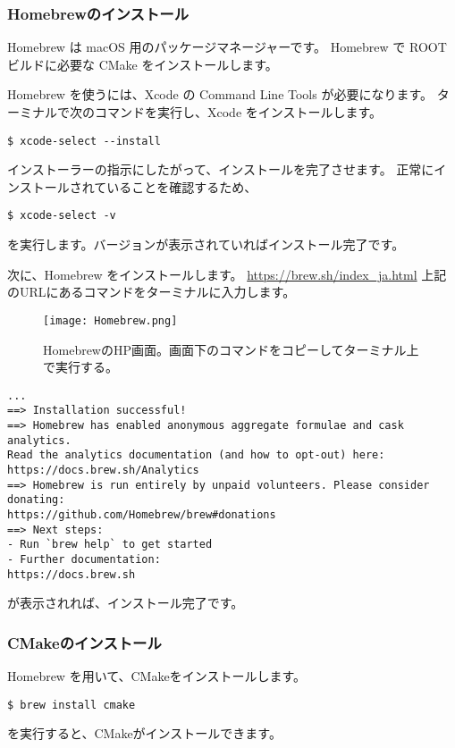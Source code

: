\subsubsection{Homebrewのインストール}
Homebrew は macOS 用のパッケージマネージャーです。
Homebrew で ROOT ビルドに必要な CMake をインストールします。\par
Homebrew を使うには、Xcode の Command Line Tools が必要になります。
ターミナルで次のコマンドを実行し、Xcode をインストールします。
\begin{lstlisting}
$ xcode-select --install
\end{lstlisting}
インストーラーの指示にしたがって、インストールを完了させます。
正常にインストールされていることを確認するため、
\begin{lstlisting}
$ xcode-select -v
\end{lstlisting}
を実行します。バージョンが表示されていればインストール完了です。\par
次に、Homebrew をインストールします。
\url{https://brew.sh/index_ja.html}
上記のURLにあるコマンドをターミナルに入力します。
\begin{figure}[H]
    \centering
    \texttt{[image: Homebrew.png]}
    \caption{HomebrewのHP画面。画面下のコマンドをコピーしてターミナル上で実行する。}
\end{figure}
\begin{lstlisting}[caption=Homebrewインストール時のスクリプト]
...
==> Installation successful!
==> Homebrew has enabled anonymous aggregate formulae and cask analytics.
Read the analytics documentation (and how to opt-out) here:
https://docs.brew.sh/Analytics
==> Homebrew is run entirely by unpaid volunteers. Please consider donating:
https://github.com/Homebrew/brew#donations
==> Next steps:
- Run `brew help` to get started
- Further documentation:
https://docs.brew.sh
\end{lstlisting}
が表示されれば、インストール完了です。\par

\subsubsection{CMakeのインストール}
Homebrew を用いて、CMakeをインストールします。
\begin{lstlisting}
$ brew install cmake
\end{lstlisting}
を実行すると、CMakeがインストールできます。

